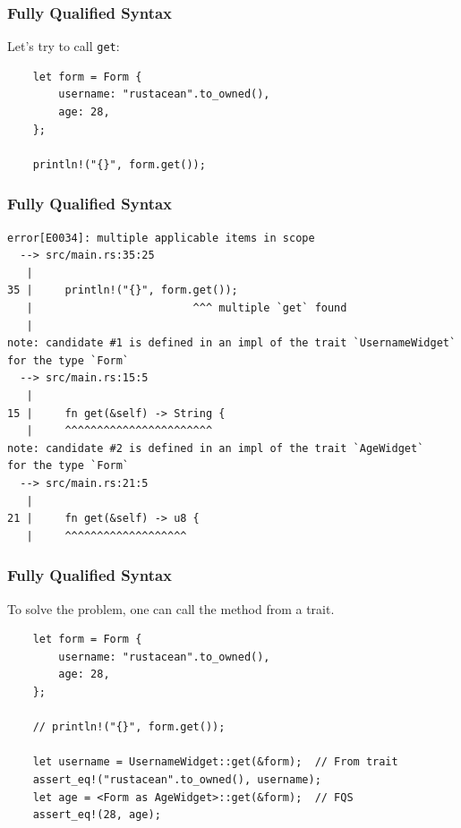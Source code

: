 \documentclass[aspectratio=1610,t]{beamer}
\begin{document}

\begin{frame}[fragile]
\frametitle{Fully Qualified Syntax}
Let's try to call \texttt{get}:

\begin{verbatim}
    let form = Form {
        username: "rustacean".to_owned(),
        age: 28,
    };

    println!("{}", form.get());
\end{verbatim}
\end{frame}


\begin{frame}[fragile]
\frametitle{Fully Qualified Syntax}
\begin{verbatim}
error[E0034]: multiple applicable items in scope
  --> src/main.rs:35:25
   |
35 |     println!("{}", form.get());
   |                         ^^^ multiple `get` found
   |
note: candidate #1 is defined in an impl of the trait `UsernameWidget`
for the type `Form`
  --> src/main.rs:15:5
   |
15 |     fn get(&self) -> String {
   |     ^^^^^^^^^^^^^^^^^^^^^^^
note: candidate #2 is defined in an impl of the trait `AgeWidget`
for the type `Form`
  --> src/main.rs:21:5
   |
21 |     fn get(&self) -> u8 {
   |     ^^^^^^^^^^^^^^^^^^^
\end{verbatim}
\end{frame}


\begin{frame}[fragile]
\frametitle{Fully Qualified Syntax}
To solve the problem, one can call the method from a trait.

\begin{verbatim}
    let form = Form {
        username: "rustacean".to_owned(),
        age: 28,
    };

    // println!("{}", form.get());

    let username = UsernameWidget::get(&form);  // From trait
    assert_eq!("rustacean".to_owned(), username);
    let age = <Form as AgeWidget>::get(&form);  // FQS
    assert_eq!(28, age);
\end{verbatim}
\end{frame}

\end{document}
